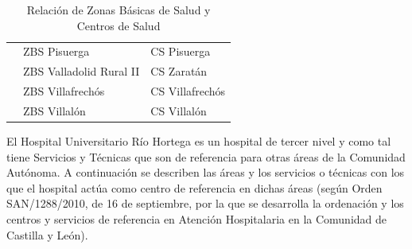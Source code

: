 \begin{table}[H]
\begin{tabular}{cll}
                                                     & ZBS Pisuerga            & CS Pisuerga                \\
                                                     & ZBS Valladolid Rural II & CS Zaratán                 \\
                                                     & ZBS Villafrechós        & CS Villafrechós            \\
                                                     & ZBS Villalón            & CS Villalón                \\
        \bottomrule
    \end{tabular}
    \caption{Relación de Zonas Básicas de Salud y Centros de Salud}
\end{table}

El Hospital Universitario Río Hortega es un hospital de tercer nivel y como tal tiene Servicios y Técnicas que son de referencia para otras áreas de la Comunidad Autónoma. A continuación se describen las áreas y los servicios o técnicas con los que el hospital actúa como centro de referencia en dichas áreas (según Orden SAN/1288/2010, de 16 de septiembre, por la que se desarrolla la ordenación y los centros y servicios de referencia en Atención Hospitalaria en la Comunidad de Castilla y León).

